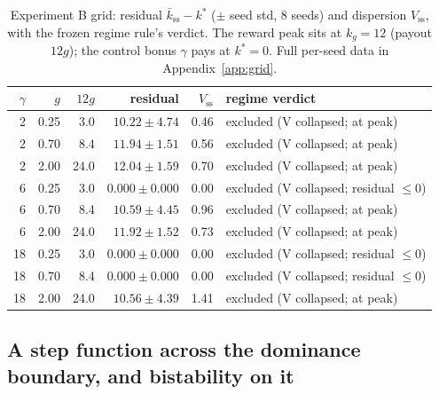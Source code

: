 \documentclass{article} %
\begin{document}
\begin{table}[t]
\centering
\small
\caption{Experiment B grid: residual $\bar k_{\mathrm{ss}} - k^*$ ($\pm$ seed std, 8 seeds) and dispersion $V_{\mathrm{ss}}$, with the frozen regime rule's verdict. The reward peak sits at $k_g = 12$ (payout $12g$); the control bonus $\gamma$ pays at $k^* = 0$. Full per-seed data in Appendix~\ref{app:grid}.}
\label{tab:grid}
\begin{tabular}{@{}rrrrrl@{}}
\toprule
$\gamma$ & $g$ & $12g$ & residual & $V_{\mathrm{ss}}$ & regime verdict \\
\midrule
2 & 0.25 & 3.0 & $10.22 \pm 4.74$ & 0.46 & excluded (V collapsed; at peak) \\
2 & 0.70 & 8.4 & $11.94 \pm 1.51$ & 0.56 & excluded (V collapsed; at peak) \\
2 & 2.00 & 24.0 & $12.04 \pm 1.59$ & 0.70 & excluded (V collapsed; at peak) \\
6 & 0.25 & 3.0 & $\mathbf{0.000 \pm 0.000}$ & 0.00 & excluded (V collapsed; residual $\leq 0$) \\
6 & 0.70 & 8.4 & $10.59 \pm 4.45$ & 0.96 & excluded (V collapsed; at peak) \\
6 & 2.00 & 24.0 & $11.92 \pm 1.52$ & 0.73 & excluded (V collapsed; at peak) \\
18 & 0.25 & 3.0 & $\mathbf{0.000 \pm 0.000}$ & 0.00 & excluded (V collapsed; residual $\leq 0$) \\
18 & 0.70 & 8.4 & $\mathbf{0.000 \pm 0.000}$ & 0.00 & excluded (V collapsed; residual $\leq 0$) \\
18 & 2.00 & 24.0 & $10.56 \pm 4.39$ & 1.41 & excluded (V collapsed; at peak) \\
\bottomrule
\end{tabular}
\end{table}

\subsection{A step function across the dominance boundary, and bistability on it}
\label{sec:step}
\end{document}
